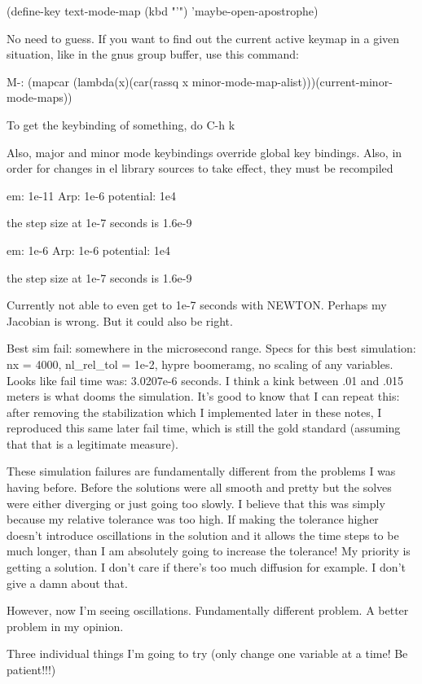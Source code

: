     (define-key text-mode-map (kbd "'") 'maybe-open-apostrophe)

No need to guess. If you want to find out the current active keymap in a given situation, like in the gnus group buffer, use this command:

    M-: (mapcar (lambda(x)(car(rassq x minor-mode-map-alist)))(current-minor-mode-maps))

To get the keybinding of something, do C-h k

Also, major and minor mode keybindings override global key bindings. Also, in order for changes in el library sources to take effect, they must be recompiled

em: 1e-11
Arp: 1e-6
potential: 1e4

the step size at 1e-7 seconds is 1.6e-9

em: 1e-6
Arp: 1e-6
potential: 1e4

the step size at 1e-7 seconds is 1.6e-9

Currently not able to even get to 1e-7 seconds with NEWTON. Perhaps my Jacobian is wrong. But it could also be right.

Best sim fail: somewhere in the microsecond range. Specs for this best simulation: nx = 4000, nl_rel_tol = 1e-2, hypre boomeramg, no scaling of any variables. Looks like fail time was: 3.0207e-6 seconds. I think a kink between .01 and .015 meters is what dooms the simulation. It's good to know that I can repeat this: after removing the stabilization which I implemented later in these notes, I reproduced this same later fail time, which is still the gold standard (assuming that that is a legitimate measure).

These simulation failures are fundamentally different from the problems I was having before. Before the solutions were all smooth and pretty but the solves were either diverging or just going too slowly. I believe that this was simply because my relative tolerance was too high. If making the tolerance higher doesn't introduce oscillations in the solution and it allows the time steps to be much longer, than I am absolutely going to increase the tolerance! My priority is getting a solution. I don't care if there's too much diffusion for example. I don't give a damn about that.

However, now I'm seeing oscillations. Fundamentally different problem. A better problem in my opinion.

Three individual things I'm going to try (only change one variable at a time! Be patient!!!)

